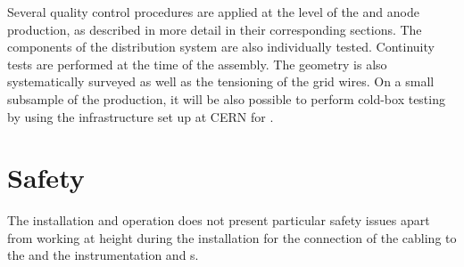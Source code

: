 Several quality control 
procedures are applied at the level of the  and anode production, as described in more detail in their corresponding sections. The components of the  distribution system are also individually tested. Continuity tests are performed at the time of the  assembly. The  geometry is also systematically surveyed as well as the tensioning of the grid wires. On a small subsample of the  production, it will be also possible to perform cold-box testing by using the infrastructure set up at CERN for .







\section{Safety}
\label{sec:fddp-crp-safety}

The  installation and operation does not present particular safety issues apart from working at height during the  installation for the connection of the cabling to the  and the instrumentation and  \fdth{}s.







